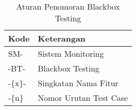 \begin{table}[!h]
    \caption{Aturan Penomoran Blackbox Testing}
    \centering
    \begin{tabular}
        {
            >{\centering\arraybackslash}p{}
            >{\centering\arraybackslash}p{}
        }
        \toprule

        Kode &
        Keterangan \\ [1ex]

        \midrule

        SM- & Sistem Monitoring \\
        -BT- & Blackbox Testing \\
        -\{x\}- & Singkatan Nama Fitur \\
        -\{n\} & Nomor Urutan Test Case \\

        \bottomrule
    \end{tabular}
    \label{tab:nr-blackbox}
\end{table}